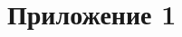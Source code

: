 \documentclass[a5paper, 10pt]{article}
\theoremstyle{definition}
\theoremstyle{plain}
\theoremstyle{remark}
\begin{document}
\section{Приложение 1}
\begin{figure}[h!]
\begin{minipage}[h!]{0.49\linewidth}
\end{minipage}
\label{ris:image1}
\end{figure}
\end{document}
